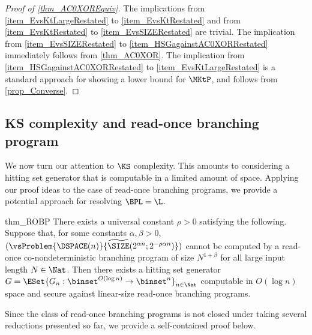 \documentclass{toc}
\begin{document}
\begin{proof}
  [Proof of \cref{thm_AC0XOREquiv}]
  The implications from \cref{item_EvsKtLargeRestated} to \cref{item_EvsKtRestated} and from \cref{item_EvsKtRestated} to \cref{item_EvsSIZERestated} are trivial.
  The implication from \cref{item_EvsSIZERestated} to \cref{item_HSGagainstAC0XORRestated} immediately follows from \cref{thm_AC0XOR}.
  The implication from \cref{item_HSGagainstAC0XORRestated} to \cref{item_EvsKtLargeRestated} is a standard approach for showing a lower bound for $\MKtP$,
  and follows from \cref{prop_Converse}.
\end{proof}



\subsection{KS complexity and read-once branching program}
\label{section_KSandROBP}

We now turn our attention to $\KS$ complexity.
This amounts to considering a hitting set generator that is computable in a limited amount of space.
Applying our proof ideas to the case of read-once branching programs,
we provide a potential approach for resolving $\BPL = \L$.


\begin{restatetheorem}
  {thm_ROBP}
  There exists a universal constant $\rho > 0$ satisfying the following.
  Suppose that, for some constants $\alpha, \beta > 0$,
  $(\vsProblem{\DSPACE(n)} { \widetilde{\SIZE}(2^{\alpha n}; 2^{- \rho \alpha n }) })$ cannot
  be computed by a read-once co-nondeterministic branching program of size $N^{1 + \beta}$
  for all large input length $N \in \Nat$.
  Then there exists a hitting set generator $G = \ESet{ G_n : \binset^{O(\log n)} \to \binset^n }_{n \in \Nat} $ computable in $O(\log n)$ space and secure against linear-size read-once branching programs.
\end{restatetheorem}

Since the class of read-once branching programs is not closed under taking several reductions presented so far,
we provide a self-contained proof below.

%
%
%
%
%
%
%
%
%
%
%
%
%
%
%
%
%
%
%
%
\end{document}
